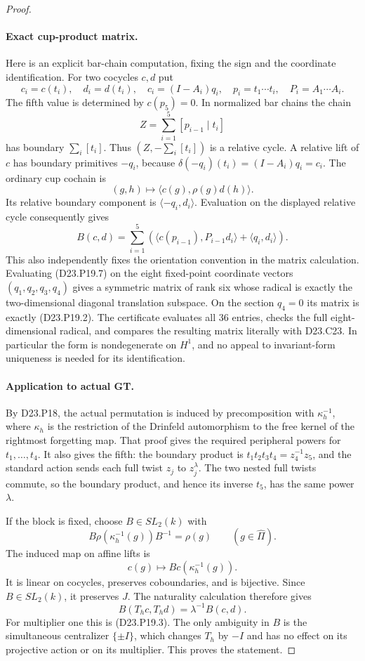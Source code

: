 \begin{proof}
\paragraph{Exact cup-product matrix.}
Here is an explicit bar-chain computation, fixing the sign
and the coordinate identification. For two cocycles $c,d$
put
\[
 c_i=c(t_i),\quad d_i=d(t_i),\quad
 c_i=(I-A_i)q_i,\quad
 p_i=t_1\cdots t_i,\quad P_i=A_1\cdots A_i.
\]
The fifth value is determined by $c(p_5)=0$. In normalized
bar chains the chain
\[
                  Z=\sum_{i=1}^5[p_{i-1}\mid t_i]
\]
has boundary $\sum_i[t_i]$. Thus
$(Z,-\sum_i[t_i])$ is a relative cycle. A relative lift of
$c$ has boundary primitives $-q_i$, because
$\delta(-q_i)(t_i)=(I-A_i)q_i=c_i$. The ordinary cup
cochain is
\[
               (g,h)\longmapsto
                 \langle c(g),\rho(g)d(h)\rangle.
\]
Its relative boundary component is
$\langle-q_i,d_i\rangle$. Evaluation on the displayed
relative cycle consequently gives
\[
 B(c,d)=\sum_{i=1}^5
       \left(\langle c(p_{i-1}),P_{i-1}d_i\rangle
                       +\langle q_i,d_i\rangle\right).
 \tag{D23.P19.7}
\]
This also independently fixes the orientation convention in
the matrix calculation. Evaluating (D23.P19.7) on the eight
fixed-point coordinate vectors $(q_1,q_2,q_3,q_4)$ gives a
symmetric matrix of rank six whose radical is exactly the
two-dimensional diagonal translation subspace. On the
section $q_4=0$ its matrix is exactly (D23.P19.2).
The certificate evaluates all 36 entries, checks the full
eight-dimensional radical, and compares the resulting
matrix literally with D23.C23. In particular the form is
nondegenerate on $H^1$, and no appeal to invariant-form
uniqueness is needed for its identification.

\paragraph{Application to actual GT.}
By D23.P18, the actual permutation is induced by
precomposition with $\kappa_h^{-1}$, where $\kappa_h$ is the
restriction of the Drinfeld automorphism to the free kernel
of the rightmost forgetting map. That proof gives the
required peripheral powers for $t_1,\ldots,t_4$. It also
gives the fifth: the boundary product is
$t_1t_2t_3t_4=z_4^{-1}z_5$, and the standard action sends
each full twist $z_j$ to $z_j^\lambda$. The two nested full
twists commute, so the boundary product, and hence its
inverse $t_5$, has the same power $\lambda$.

If the block is fixed, choose $B\in SL_2(k)$ with
\[
 B\rho(\kappa_h^{-1}(g))B^{-1}=\rho(g)
                  \qquad(g\in\widehat\Pi).
\]
The induced map on affine lifts is
\[
                     c(g)\longmapsto
                       Bc(\kappa_h^{-1}(g)).              \tag{D23.P19.8}
\]
It is linear on cocycles, preserves coboundaries, and is
bijective. Since $B\in SL_2(k)$, it preserves $J$.
The naturality calculation therefore gives
\[
                B(T_hc,T_hd)=\lambda^{-1}B(c,d).
\]
For multiplier one this is (D23.P19.3). The only ambiguity
in $B$ is the simultaneous centralizer $\{\pm I\}$, which
changes $T_h$ by $-I$ and has no effect on its projective
action or on its multiplier. This proves the statement.
\end{proof}

